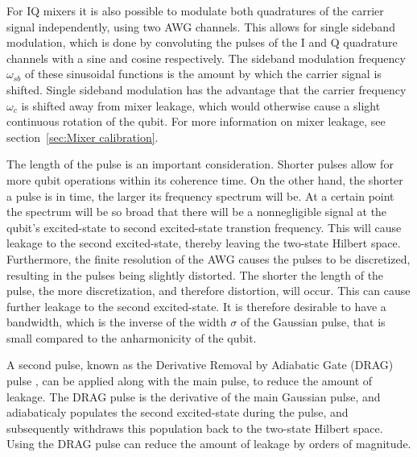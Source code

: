         For IQ mixers it is also possible to modulate both quadratures of the carrier signal independently, using two AWG channels. This allows for single sideband modulation, which is done by convoluting the pulses of the I and Q quadrature channels with a sine and cosine respectively. The sideband modulation frequency $\omega_{sb}$ of these sinusoidal functions is the amount by which the carrier signal is shifted. Single sideband modulation has the advantage that the carrier frequency $\omega_c$ is shifted away from mixer leakage, which would otherwise cause a slight continuous rotation of the qubit. For more information on mixer leakage, see section~\ref{sec:Mixer calibration}.

        The length of the pulse is an important consideration. Shorter pulses allow for more qubit operations within its coherence time. On the other hand, the shorter a pulse is in time, the larger its frequency spectrum will be. At a certain point the spectrum will be so broad that there will be a nonnegligible signal at the qubit's excited-state to second excited-state transtion frequency. This will cause leakage to the second excited-state, thereby leaving the two-state Hilbert space.
        Furthermore, the finite resolution of the AWG causes the pulses to be discretized, resulting in the pulses being slightly distorted. The shorter the length of the pulse, the more discretization, and therefore distortion, will occur. This can cause further leakage to the second excited-state. It is therefore desirable to have a bandwidth, which is the inverse of the width $\sigma$ of the Gaussian pulse, that is small compared to the anharmonicity of the qubit.

        A second pulse, known as the Derivative Removal by Adiabatic Gate (DRAG) pulse \cite{motzoi2009simple}, can be applied along with the main pulse, to reduce the amount of leakage. The DRAG pulse is the derivative of the main Gaussian pulse, and adiabaticaly populates the second excited-state during the pulse, and subsequently withdraws this population back to the two-state Hilbert space. Using the DRAG pulse can reduce the amount of leakage by orders of magnitude.

